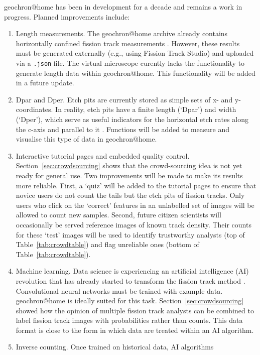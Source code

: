 \documentclass[gchron, manuscript]{copernicus}
\begin{document}
geochron@home has been in development for a decade and remains a work
in progress. Planned improvements include:

\begin{enumerate}
\item Length measurements. The geochron@home archive already
  contains horizontally confined fission track measurements
  \citep{tamer2025}.  However, these results must be generated
  externally (e.g., using Fission Track Studio) and uploaded via a
  \texttt{.json} file.  The virtual microscope curently lacks the
  functionality to generate length data within
  geochron@home. This functionality will be added in a future
  update.
\item Dpar and Dper. Etch pits are currently stored as simple sets of
  x- and y-coordinates.  In reality, etch pits have a finite length
  (`Dpar') and width (`Dper'), which serve as useful indicators for
  the horizontal etch rates along the c-axis and parallel to it
  \citep{donelick1993}. Functions will be added to measure and
  visualise this type of data in geochron@home.
\item Interactive tutorial pages and embedded quality
  control. Section~\ref{sec:crowdsourcing} shows that the
  crowd-sourcing idea is not yet ready for general use. Two
  improvements will be made to make its results more reliable. First,
  a `quiz' will be added to the tutorial pages to ensure that novice
  users do not count the tails but the etch pits of fission
  tracks. Only users who click on the `correct' features in an
  unlabelled set of images will be allowed to count new
  samples. Second, future citizen scientists will occasionally be
  served reference images of known track density. Their counts for
  these `test' images will be used to identify trustworthy analysts
  (top of Table~\ref{tab:crowdtable}) and flag unreliable ones (bottom
  of Table~\ref{tab:crowdtable}).
\item Machine learning. Data science is experiencing an artificial
  intelligence (AI) revolution that has already started to transform
  the fission track method \citep{nachtergaele2020}.  Convolutional
  neural networks must be trained with example data. geochron@home is
  ideally suited for this task. Section~\ref{sec:crowdsourcing} showed
  how the opinion of multiple fission track analysts can be combined
  to label fission track images with probabilities rather than
  counts. This data format is close to the form in which data are
  treated within an AI algorithm.
\item Inverse counting. Once trained on historical data, AI algorithms

\end{enumerate}
\end{document}
